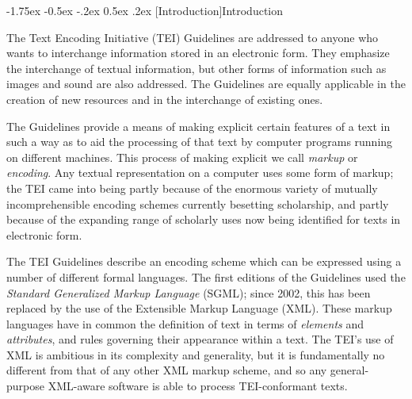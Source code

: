 \documentclass[11pt,twoside]{article}\makeatletter
\makeatletter
\renewcommand\section{\@startsection {section}{1}{\z@}%
     {-1.75ex \@plus -0.5ex \@minus -.2ex}%
     {0.5ex \@plus .2ex}%
     {\reset@font\Large\bfseries\sffamily}}
\makeatother
\begin{document}
\section[{Introduction}]{Introduction}\label{U5-Intro}\par
The Text Encoding Initiative (TEI) Guidelines are addressed to anyone who wants to interchange information stored in an electronic form. They emphasize the interchange of textual information, but other forms of information such as images and sound are also addressed. The Guidelines are equally applicable in the creation of new resources and in the interchange of existing ones.\par
The Guidelines provide a means of making explicit certain features of a text in such a way as to aid the processing of that text by computer programs running on different machines. This process of making explicit we call \textit{markup} or \textit{encoding}. Any textual representation on a computer uses some form of markup; the TEI came into being partly because of the enormous variety of mutually incomprehensible encoding schemes currently besetting scholarship, and partly because of the expanding range of scholarly uses now being identified for texts in electronic form.\par
The TEI Guidelines describe an encoding scheme which can be expressed using a number of different formal languages. The first editions of the Guidelines used the \textit{Standard Generalized Markup Language} (SGML); since 2002, this has been replaced by the use of the Extensible Markup Language (XML). These markup languages have in common the definition of text in terms of \textit{elements} and \textit{attributes}, and rules governing their appearance within a text. The TEI's use of XML is ambitious in its complexity and generality, but it is fundamentally no different from that of any other XML markup scheme, and so any general-purpose XML-aware software is able to process TEI-conformant texts.\par
\end{document}

